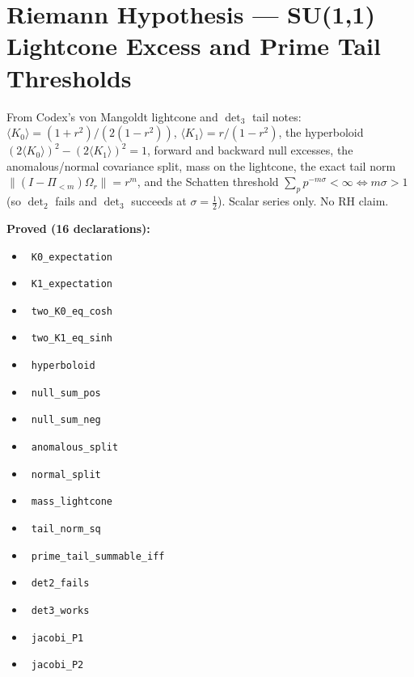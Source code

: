 \documentclass{report}
\theoremstyle{definition}
\begin{document}
\section{Riemann Hypothesis --- SU(1,1) Lightcone Excess and Prime Tail Thresholds}
From Codex's von Mangoldt lightcone and $\det_3$ tail notes: $\langle K_0\rangle=(1+r^2)/(2(1-r^2))$, $\langle K_1\rangle=r/(1-r^2)$, the hyperboloid $(2\langle K_0\rangle)^2-(2\langle K_1\rangle)^2=1$, forward and backward null excesses, the anomalous/normal covariance split, mass on the lightcone, the exact tail norm $\|(I-\Pi_{<m})\Omega_r\|=r^m$, and the Schatten threshold $\sum_pp^{-m\sigma}<\infty\iff m\sigma>1$ (so $\det_2$ fails and $\det_3$ succeeds at $\sigma=\tfrac12$). Scalar series only. No RH claim.

\noindent\textbf{Proved (16 declarations):}
\begin{itemize}
  \item {}\leanok\ \texttt{K0\_expectation}
  \item {}\leanok\ \texttt{K1\_expectation}
  \item {}\leanok\ \texttt{two\_K0\_eq\_cosh}
  \item {}\leanok\ \texttt{two\_K1\_eq\_sinh}
  \item {}\leanok\ \texttt{hyperboloid}
  \item {}\leanok\ \texttt{null\_sum\_pos}
  \item {}\leanok\ \texttt{null\_sum\_neg}
  \item {}\leanok\ \texttt{anomalous\_split}
  \item {}\leanok\ \texttt{normal\_split}
  \item {}\leanok\ \texttt{mass\_lightcone}
  \item {}\leanok\ \texttt{tail\_norm\_sq}
  \item {}\leanok\ \texttt{prime\_tail\_summable\_iff}
  \item {}\leanok\ \texttt{det2\_fails}
  \item {}\leanok\ \texttt{det3\_works}
  \item {}\leanok\ \texttt{jacobi\_P1}
  \item {}\leanok\ \texttt{jacobi\_P2}
\end{itemize}
\end{document}
